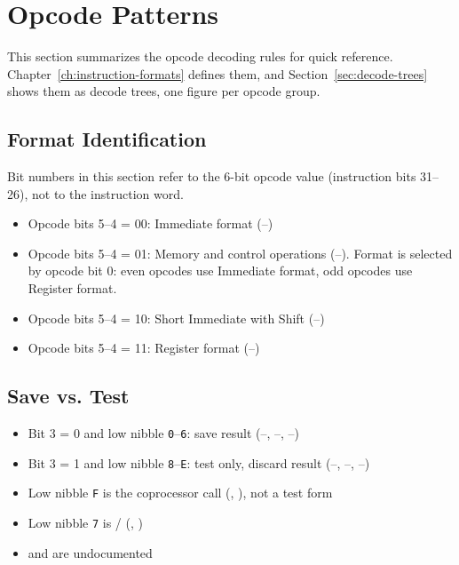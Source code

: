 \section{Opcode Patterns}

This section summarizes the opcode decoding rules for quick reference. Chapter~\ref{ch:instruction-formats} defines
them, and Section~\ref{sec:decode-trees} shows them as decode trees, one figure per opcode group.

\subsection{Format Identification}

Bit numbers in this section refer to the 6-bit opcode value (instruction bits 31--26), not to the instruction word.

\begin{itemize}
	\item Opcode bits 5--4 = 00: Immediate format (--)
	\item Opcode bits 5--4 = 01: Memory and control operations (--). Format is selected by opcode bit 0:
	      even opcodes use Immediate format, odd opcodes use Register format.
	\item Opcode bits 5--4 = 10: Short Immediate with Shift (--)
	\item Opcode bits 5--4 = 11: Register format (--)
\end{itemize}

\subsection{Save vs. Test}

\begin{itemize}
	\item Bit 3 = 0 and low nibble \texttt{0}--\texttt{6}: save result (--, --,
	      --)
	\item Bit 3 = 1 and low nibble \texttt{8}--\texttt{E}: test only, discard result (--,
	      --, --)
	\item Low nibble \texttt{F} is the coprocessor call (, ), not a test form
	\item Low nibble \texttt{7} is / (, )
	\item {} and  are undocumented
\end{itemize}

